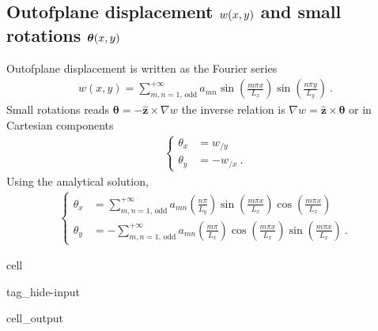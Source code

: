 \documentclass[letterpaper,10pt,english]{jupyterBook}
\begin{document}
\subsection{Out\sphinxhyphen{}of\sphinxhyphen{}plane displacement \protect\(w(x,y)\protect\) and small rotations \protect\(\boldsymbol\theta(x,y)\protect\)}
\label{\detokenize{ch/solids/plates-shells/kirchhoff-analytic-sln:out-of-plane-displacement-w-x-y-and-small-rotations-boldsymbol-theta-x-y}}
\sphinxAtStartPar
Out\sphinxhyphen{}of\sphinxhyphen{}plane displacement is written as the Fourier series
\begin{equation*}
\begin{split}w(x,y) = \sum_{m,n=1, \, \text{odd}}^{+\infty} a_{mn} \sin \left( \frac{m \pi x}{L_x} \right) \sin \left(  \frac{n \pi y}{L_y} \right) \ .\end{split}
\end{equation*}
\sphinxAtStartPar
Small rotations reads \(\boldsymbol \theta = - \hat{\mathbf{z}} \times \nabla w\) \sphinxhyphen{} the inverse relation is \(\nabla w = \hat{\mathbf{z}} \times \boldsymbol\theta\) \sphinxhyphen{} or in Cartesian components
\begin{equation*}
\begin{split}\left\{ \begin{aligned}
  \theta_x & = w_{/y} \\
  \theta_y & = -w_{/x} \ .
\end{aligned} \right.\end{split}
\end{equation*}
\sphinxAtStartPar
Using the analytical solution,
\begin{equation*}
\begin{split}\left\{ \begin{aligned}
  \theta_x & = \sum_{m,n=1, \, \text{odd}}^{+\infty} a_{mn} \left( \frac{n \pi}{L_y} \right) \sin \left( \frac{m \pi x}{L_x} \right) \cos \left(  \frac{m \pi x}{L_x} \right) \\
  \theta_y & = - \sum_{m,n=1, \, \text{odd}}^{+\infty} a_{mn} \left( \frac{m \pi}{L_x} \right) \cos \left( \frac{m \pi x}{L_x} \right) \sin \left(  \frac{m \pi x}{L_x} \right) \ .
\end{aligned} \right.\end{split}
\end{equation*}
\begin{sphinxuseclass}{cell}
\begin{sphinxuseclass}{tag_hide-input}\begin{sphinxVerbatimOutput}

\begin{sphinxuseclass}{cell_output}
\noindent{}

\noindent{}

\end{sphinxuseclass}\end{sphinxVerbatimOutput}

\end{sphinxuseclass}
\end{sphinxuseclass}
\end{document}

